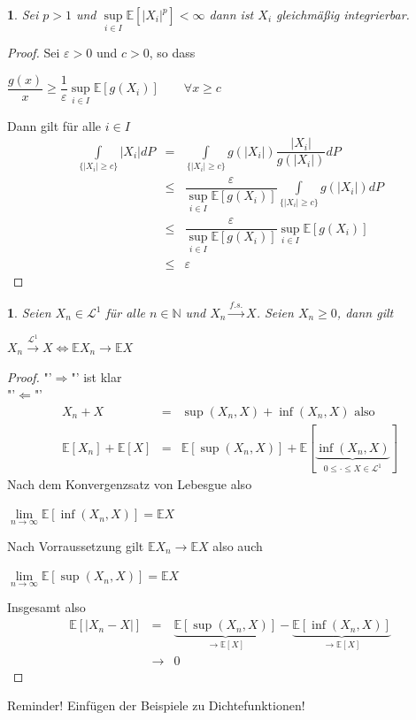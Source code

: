 \documentclass[10pt,a4paper]{report}
\newcommand{\E}{\mathbb{E}}
\newcommand{\N}{\mathbb{N}}
\numberwithin{equation}{section}
\numberwithin{figure}{section}
\theoremstyle{plain}
\theoremstyle{definition}
\theoremstyle{remark}
\theoremstyle{plain}
\newtheorem{prop}[thm]{\protect\propositionname}
\newtheorem{cor}[thm]{\protect\corollaryname}
\providecommand{\corollaryname}{Korollar}
\providecommand{\propositionname}{Satz}
\newcommand{\1}{ \mathbb{1} } %
\begin{document}
\begin{cor}
  Sei $p>1$ und $\sup\limits_{i \in I}\E[|X_i|^p]<\infty$ dann ist
  $X_i$ gleichmäßig integrierbar.
\end{cor}
  \begin{proof}
    Sei $\varepsilon > 0$ und $c>0$, so dass
    \begin{center}
      $\dfrac{g(x)}{x}\geq \dfrac{1}{\varepsilon} \sup\limits_{i \in
        I}\E[g(X_i)] \qquad \forall x \geq c$
    \end{center}
    Dann gilt für alle $i \in I$
    \begin{eqnarray*}
      \int\limits_{\{|X_i|\geq c\}} |X_i|dP &=& \int\limits_{\{|X_i|\geq c\}} g(|X_i|)\dfrac{|X_i|}{g(|X_i|)} dP\\
      &\leq &\dfrac{\varepsilon}{\sup\limits_{i \in I}\E[g(X_i)]}\int\limits_{\{|X_i|\geq c\}} g(|X_i|)dP\\
      &\leq & \dfrac{\varepsilon}{\sup\limits_{i \in I}\E[g(X_i)]}\sup\limits_{i \in I}\E[g(X_i)]\\
      &\leq & \varepsilon 
    \end{eqnarray*}
  \end{proof}

\begin{prop}
  Seien $X_n \in \mathcal{L}^1$ für alle $n \in \N$ und $X_n
  \overset{f.s.}{\to} X$. Seien $X_n\geq 0$, dann gilt
  \begin{center}
    $X_n \overset{\mathcal{L}^1}{\to} X \Leftrightarrow \E X_n \to \E
    X$
  \end{center}
\end{prop}
\begin{proof} 
  "'$\Rightarrow$"' ist klar\\
  "'$\Leftarrow$"'
  \begin{eqnarray*}
    X_n+X &=& \sup(X_n,X)+\inf(X_n,X) \text{ also }\\
    \E[X_n]+\E[X] &=& \E[\sup(X_n,X)]+\E[\underbrace{\inf(X_n,X)}_{0 \leq \cdot \leq X \in \mathcal{L}^1}]
  \end{eqnarray*}
  Nach dem Konvergenzsatz von Lebesgue also
  \begin{center}
    $\lim\limits_{n \to \infty} \E[\inf(X_n,X)]=\E X$
  \end{center}
  Nach Vorraussetzung gilt $\E X_n \to \E X$ also auch
  \begin{center}
    $\lim\limits_{n \to \infty} \E[\sup(X_n,X)]=\E X$
  \end{center}
  Insgesamt also
  \begin{eqnarray*}
    \E[|X_n-X|] &=&\underbrace{\E[\sup(X_n,X)]}_{\to \E[X]}-\underbrace{\E[\inf(X_n,X)]}_{\to \E[X]}\\
    & \to & 0 
  \end{eqnarray*}
\end{proof}
Reminder! Einfügen der Beispiele zu Dichtefunktionen!
\end{document}
